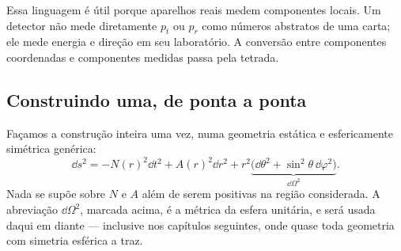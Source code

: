 \documentclass[12pt,a4paper,oneside]{book}
\theoremstyle{rgplain}
\theoremstyle{rgremark}
\begin{document}
Essa linguagem é útil porque aparelhos reais medem componentes locais. Um
detector não mede diretamente $p_t$ ou $p_r$ como números abstratos de uma
carta; ele mede energia e direção em seu laboratório. A conversão entre
componentes coordenadas e componentes medidas passa pela tetrada.

\subsection*{Construindo uma, de ponta a ponta}

Façamos a construção inteira uma vez, numa geometria estática e
esfericamente simétrica genérica:
\begin{equation}
  \dd s^2=-N(r)^2\dd t^2+A(r)^2\dd r^2
  +r^2\underbrace{\bigl(\dd\theta^2+\sin^2\theta\,\dd\varphi^2\bigr)}
       _{\textstyle\dd\Omega^2} .
  \label{eq:metrica-estatica-generica}
\end{equation}
Nada se supõe sobre $N$ e $A$ além de serem positivas na região considerada. A
abreviação $\dd\Omega^2$, marcada acima, é a métrica da esfera unitária, e será
usada daqui em diante --- inclusive nos capítulos seguintes, onde quase toda
geometria com simetria esférica a traz.
\end{document}
